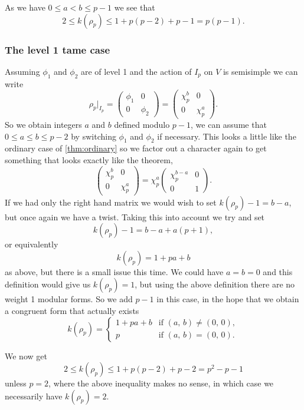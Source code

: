 \documentclass[a4paper,12pt]{article}
\begin{document}
As we have $0 \le a< b \le p-1$ we see that
\[
2\le k(\rho_p) \le 1 + p(p-2) + p-1 = p(p-1).
\]


\subsubsection{The level 1 tame case}\label{sec:l1t}
Assuming $\phi_1$ and $\phi_2$ are of level 1 and the action of $I_p$ on $V$ is semisimple we can write
\[
\rho_p |_{I_p} = \begin{pmatrix}
\phi_1 & 0 \\
0      & \phi_2 \end{pmatrix} = \begin{pmatrix}
\chi_p^b & 0 \\
0      & \chi_p^a \end{pmatrix}.
\]
So we obtain integers $a$ and $b$ defined modulo $p-1$, we can assume that $0\le a \le b \le p-2$ by switching $\phi_1$ and $\phi_2$ if necessary.
This looks a little like the ordinary case of \cref{thm:ordinary} so we factor out a character again to get something that looks exactly like the theorem,
\[
\begin{pmatrix}
\chi_p^b & 0 \\
0        & \chi_p^a \end{pmatrix}=
\chi_p^a\begin{pmatrix}
\chi_p^{b-a} & 0 \\
0            & 1 \end{pmatrix}.
\]
If we had only the right hand matrix we would wish to set $k(\rho_p) - 1 = b-a$, but once again we have a twist.
Taking this into account we try and set
\[
k(\rho_p) - 1 = b - a + a(p+1),
\]
or equivalently
\[
k(\rho_p) = 1 + pa + b
\]
as above, but there is a small issue this time.
We could have $a = b = 0$ and this definition would give us $k(\rho_p) = 1$, but using the above definition there are no weight 1 modular forms.
So we add $p-1$ in this case, in the hope that we obtain a congruent form that actually exists %
\begin{equation}\label{eq:l1t}
k(\rho_p) = \begin{cases}
1 + pa + b & \text{if }(a,\,b) \ne (0,\,0), \\
         p & \text{if }(a,\,b) = (0,\,0).
\end{cases}
\end{equation}

We now get
\[
2\le k(\rho_p) \le 1 + p(p-2) + p-2 = p^2 - p - 1
\]
unless $p = 2$, where the above inequality makes no sense, in which case we necessarily have $k(\rho_p) = 2$.
\end{document}
